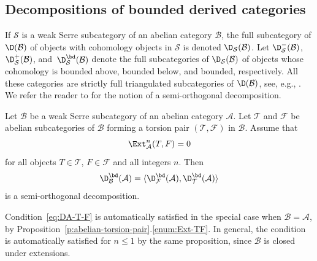 \subsection{Decompositions of bounded derived categories}
\label{sec:decomp-bound-deriv}

If $\mathcal{S}$ is a weak Serre subcategory of an abelian
category $\mathcal{B}$, the full subcategory of $\D(\mathcal{B})$
of objects with cohomology objects in
$\mathcal{S}$ is denoted
$\D_{\mathcal{S}}(\mathcal{B})$. 
Let 
$\D_{\mathcal{S}}^-(\mathcal{B})$,
$\D_{\mathcal{S}}^+(\mathcal{B})$,
and~$\D_{\mathcal{S}}^\bd(\mathcal{B})$ denote the full subcategories
of $\D_{\mathcal{S}}(\mathcal{B})$
of objects whose cohomology is bounded above, bounded below,
and bounded, respectively. 
All these categories are strictly full triangulated
subcategories of $\D(\mathcal{B})$, 
see, e.g., \cite[]{stacks-project}.
We refer the reader to \cite[Subsection~5.1]{BS-conservative}
for the notion of a semi-orthogonal decomposition.

\begin{theorem}
  \label{t:sod-DbBA}
  Let $\mathcal{B}$ be a weak Serre subcategory of an abelian
  category $\mathcal{A}$.
  Let 
  $\mathcal{T}$ and
  $\mathcal{F}$ be abelian subcategories of $\mathcal{B}$
  forming a torsion pair $(\mathcal{T}, \mathcal{F})$ in
  $\mathcal{B}$.
  Assume that 
  \begin{equation}
    \label{eq:DA-T-F}
    \Ext^n_{\mathcal{A}}(T, F)=0
  \end{equation}
  for all objects $T \in \mathcal{T}$, $F \in \mathcal{F}$ and
  all integers $n$. 
  Then 
  \begin{equation*}
    \D_{\mathcal{B}}^\bd(\mathcal{A})=
    \langle \D_{\mathcal{F}}^\bd(\mathcal{A}), 
    \D_{\mathcal{T}}^\bd(\mathcal{A})\rangle
  \end{equation*}
  is a semi-orthogonal decomposition.
\end{theorem}

\begin{remark}
Condition~\eqref{eq:DA-T-F} is automatically satisfied
in the special case when $\mathcal{B}=\mathcal{A}$,
by Proposition~\ref{p:abelian-torsion-pair}.\ref{enum:Ext-TF}.
In general, the condition is automatically satisfied for $n \leq 1$
by the same proposition, since $\mathcal{B}$ is closed under extensions.
\end{remark}

